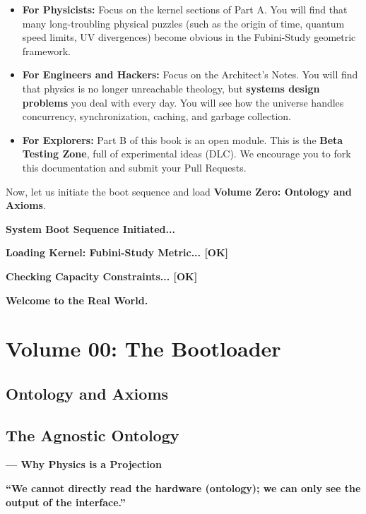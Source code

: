 \documentclass[11pt,a4paper,twoside]{book}
\begin{document}
\begin{itemize}
\item \textbf{For Physicists:} Focus on the kernel sections of Part A. You will find that many long-troubling physical puzzles (such as the origin of time, quantum speed limits, UV divergences) become obvious in the Fubini-Study geometric framework.

\item \textbf{For Engineers and Hackers:} Focus on the Architect's Notes. You will find that physics is no longer unreachable theology, but \textbf{systems design problems} you deal with every day. You will see how the universe handles concurrency, synchronization, caching, and garbage collection.

\item \textbf{For Explorers:} Part B of this book is an open module. This is the \textbf{Beta Testing Zone}, full of experimental ideas (DLC). We encourage you to fork this documentation and submit your Pull Requests.
\end{itemize}

Now, let us initiate the boot sequence and load \textbf{Volume Zero: Ontology and Axioms}.

\textbf{System Boot Sequence Initiated...}

\textbf{Loading Kernel: Fubini-Study Metric... [OK]}

\textbf{Checking Capacity Constraints... [OK]}

\textbf{Welcome to the Real World.}

\clearpage{}

\mainmatter

\part{Volume 00: The Bootloader}

\chapter{Ontology and Axioms}

\chapter{The Agnostic Ontology}

\textbf{--- Why Physics is a Projection}

\textbf{``We cannot directly read the hardware (ontology); we can only see the output of the interface.''}
\end{document}
